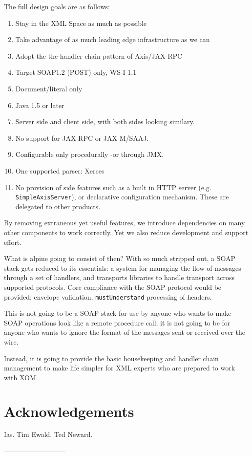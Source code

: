 \documentclass[draft]{article}
\begin{document}
The full design goals are as follows:

\begin{enumerate}

\item Stay in the XML Space as much as possible
\item Take advantage of as much leading edge infrastructure as we can
\item Adopt the the handler chain pattern of Axis/JAX-RPC
\item Target SOAP1.2 (POST) only, WS-I 1.1
\item Document/literal only
\item Java 1.5 or later 
\item Server side and client side, with both sides looking similary. 
\item No support for JAX-RPC or JAX-M/SAAJ.
\item Configurable only procedurally -or through JMX. 
\item One supported parser: Xerces

\item No provision of side features such as a built in HTTP server (e.g.
\verb|SimpleAxisServer|), or declarative configuration mechanism.
These are delegated to other products.
\end{enumerate}

By removing extraneous yet useful features, we introduce dependencies on
many other components to work correctly. Yet we also reduce development
and support effort. 

What is alpine going to consist of then? With so much stripped out, a
SOAP stack gets reduced to its essentials: a system for managing the
flow of messages through a set of handlers, and transports libraries to
handle transport across supported protocols. Core compliance with the
SOAP protocol would be provided: envelope validation,
\verb|mustUnderstand| processing of headers. 

This is not going to be a SOAP stack for use by anyone who wants to make
SOAP operations look like a remote procedure call; it is not going to be
for anyone who wants to ignore the format of the messages sent or
received over the wire. 

Instead, it is going to provide the basic housekeeping and handler chain
management to make life simpler for XML experts who are prepared to work with XOM. 

\section{Acknowledgements}

Ias. Tim Ewald. Ted Neward.  


---------------------------







\onecolumn

%


\end{document}
